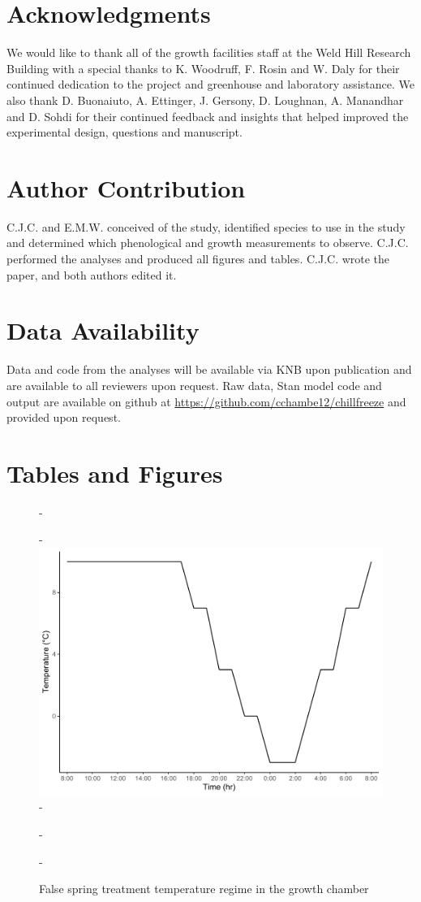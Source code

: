 \documentclass{article}\usepackage[]{graphicx}\usepackage[]{color}
\begin{document}
\section*{Acknowledgments}
We would like to thank all of the growth facilities staff at the Weld Hill Research Building with a special thanks to K. Woodruff, F. Rosin and W. Daly for their continued dedication to the project and greenhouse and laboratory assistance. We also thank D. Buonaiuto, A. Ettinger, J. Gersony, D. Loughnan, A. Manandhar and D. Sohdi for their continued feedback and insights that helped improved the experimental design, questions and manuscript.

\section*{Author Contribution} 
C.J.C. and E.M.W. conceived of the study, identified species to use in the study and determined which phenological and growth measurements to observe. C.J.C. performed the analyses and produced all figures and tables. C.J.C. wrote the paper, and both authors edited it.

\section*{Data Availability}
Data and code from the analyses will be available via KNB upon publication and are available to all reviewers upon request. Raw data, {Stan} model code and output are available on github at \url{https://github.com/cchambe12/chillfreeze} and provided upon request.




\section*{Tables and Figures}

{\begin{figure} [H]
  -\begin{center}
  -\includegraphics[width=12cm]{..//analyses/figures/growthchamber.pdf}
  -\caption{False spring treatment temperature regime in the growth chamber}\label{fig:gccond}
  -\end{center}
  -\end{figure}}
  
\end{document}
